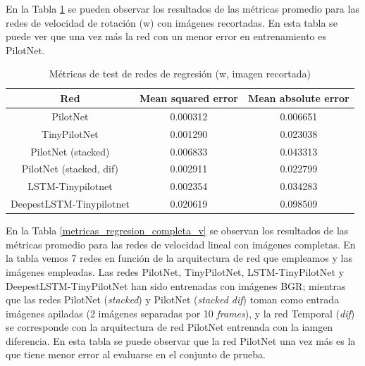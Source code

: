 En la Tabla \ref{metricas_regresion_recortada_w} se pueden observar los resultados de las métricas promedio para las redes de velocidad de rotación (w) con imágenes recortadas. En esta tabla se puede ver que una vez más la red con un menor error en entrenamiento es PilotNet.\\

\begin{table}[H]
\centering
\caption{Métricas de test de redes de regresión (w, imagen recortada)}
\label{metricas_regresion_recortada_w}
\begin{tabular}{c|c|c|}
\cline{1-3}
                        \multicolumn{1}{|c|}{Red}    & Mean squared error       & Mean absolute error             \\ \hline
\multicolumn{1}{|c|}{PilotNet}    & 0.000312   &  0.006651   \\ \hline
\multicolumn{1}{|c|}{TinyPilotNet}     & 0.001290      & 0.023038   \\ \hline
\multicolumn{1}{|c|}{PilotNet (stacked)}   & 0.006833    & 0.043313  \\ \hline
\multicolumn{1}{|c|}{PilotNet (stacked, dif)}     & 0.002911    & 0.022799        \\ \hline
\multicolumn{1}{|c|}{LSTM-Tinypilotnet}     & 0.002354    & 0.034283        \\ \hline
\multicolumn{1}{|c|}{DeepestLSTM-Tinypilotnet}     & 0.020619   & 0.098509        \\ \hline
\end{tabular}
\end{table}

En la Tabla \ref{metricas_regresion_completa_v} se observan los resultados de las métricas promedio para las redes de velocidad lineal con imágenes completas. En la tabla vemos 7 redes en función de la arquitectura de red que empleamos y las imágenes empleadas. Las redes PilotNet, TinyPilotNet, LSTM-TinyPilotNet y DeepestLSTM-TinyPilotNet han sido entrenadas con imágenes BGR; mientras que las redes PilotNet (\textit{stacked}) y PilotNet (\textit{stacked dif}) toman como entrada imágenes apiladas (2 imágenes separadas por 10 \textit{frames}), y la red Temporal (\textit{dif}) se corresponde con la arquitectura de red PilotNet entrenada con la iamgen diferencia. En esta tabla se puede observar que la red PilotNet una vez más es la que tiene menor error al evaluarse en el conjunto de prueba.\\


